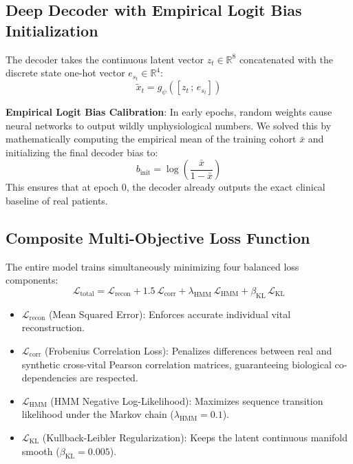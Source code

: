 \documentclass[11pt,a4paper]{article}
\begin{document}
\subsection{Deep Decoder with Empirical Logit Bias Initialization}
The decoder takes the continuous latent vector $z_t \in \mathbb{R}^8$ concatenated with the discrete state one-hot vector $e_{s_t} \in \mathbb{R}^4$:
\begin{equation}
    \tilde{x}_t = g_\psi([z_t \,;\, e_{s_t}])
\end{equation}

\textbf{Empirical Logit Bias Calibration}:
In early epochs, random weights cause neural networks to output wildly unphysiological numbers. We solved this by mathematically computing the empirical mean of the training cohort $\bar{x}$ and initializing the final decoder bias to:
\begin{equation}
    b_{\text{init}} = \log \left( \frac{\bar{x}}{1 - \bar{x}} \right)
\end{equation}
This ensures that at epoch 0, the decoder already outputs the exact clinical baseline of real patients.

\subsection{Composite Multi-Objective Loss Function}
The entire model trains simultaneously minimizing four balanced loss components:
\begin{equation}
    \mathcal{L}_{\text{total}} = \mathcal{L}_{\text{recon}} + 1.5 \, \mathcal{L}_{\text{corr}} + \lambda_{\text{HMM}} \, \mathcal{L}_{\text{HMM}} + \beta_{\text{KL}} \, \mathcal{L}_{\text{KL}}
\end{equation}
\begin{itemize}
    \item $\mathcal{L}_{\text{recon}}$ (Mean Squared Error): Enforces accurate individual vital reconstruction.
    \item $\mathcal{L}_{\text{corr}}$ (Frobenius Correlation Loss): Penalizes differences between real and synthetic cross-vital Pearson correlation matrices, guaranteeing biological co-dependencies are respected.
    \item $\mathcal{L}_{\text{HMM}}$ (HMM Negative Log-Likelihood): Maximizes sequence transition likelihood under the Markov chain ($\lambda_{\text{HMM}} = 0.1$).
    \item $\mathcal{L}_{\text{KL}}$ (Kullback-Leibler Regularization): Keeps the latent continuous manifold smooth ($\beta_{\text{KL}} = 0.005$).
\end{itemize}
\end{document}
